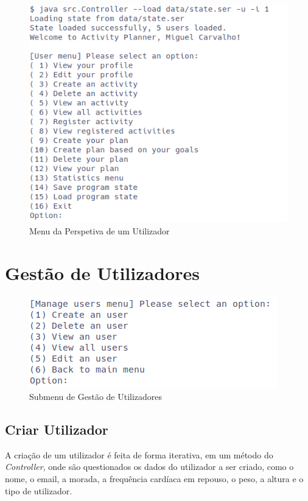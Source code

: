 \documentclass[a4paper,12pt]{scrreprt}
\begin{document}
\begin{figure}[!ht]
    \centering
    \includegraphics[width=\textwidth]{images/userMenu.png}
    \caption{Menu da Perspetiva de um Utilizador}
    \label{fig:menu-user}
\end{figure}

\clearpage
\section{Gestão de Utilizadores}
    \label{sec:gestao-utlizadores}
    \begin{figure}[!ht]
        \centering
        \includegraphics[width=\textwidth]{images/manageUsersSubMenu.png}
        \caption{Submenu de Gestão de Utilizadores}
        \label{fig:submenu-users}
    \end{figure}

    \clearpage
    \subsection{Criar Utilizador}
    A criação de um utilizador é feita de forma iterativa, em um método do \textit{Controller},
    onde são questionados os dados do utilizador a ser criado,
    como o nome, o email, a morada, a frequência cardíaca em repouso, o peso, a altura e o tipo de utilizador.
\end{document}
